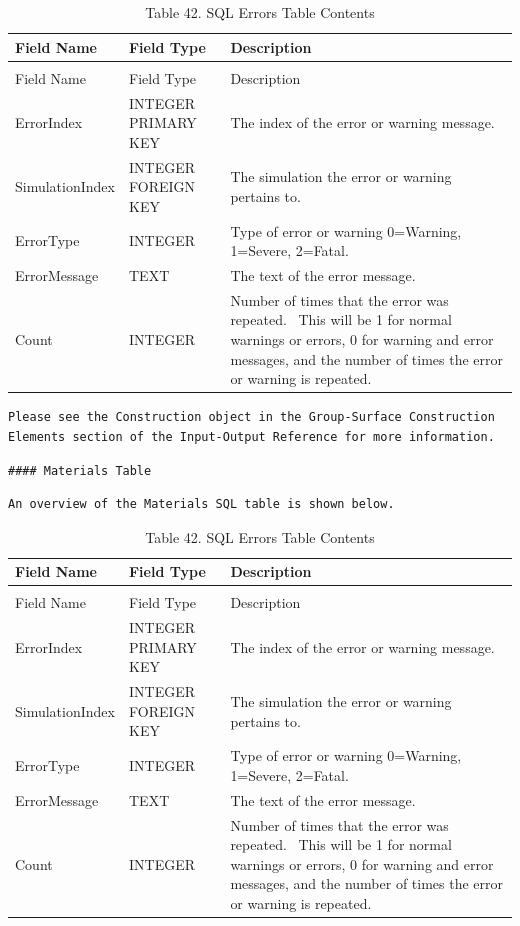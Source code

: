 \begin{longtable}[c]{p{1.5in}p{1.5in}p{2.99in}}
\caption{Table 42. SQL Errors Table Contents \label{table:table-42.-sql-errors-table-contents}} \tabularnewline
\toprule 
Field Name & Field Type & Description \tabularnewline
\midrule
\endfirsthead

\caption[]{Table 42. SQL Errors Table Contents} \tabularnewline
\toprule 
Field Name & Field Type & Description \tabularnewline
\midrule
\endhead

ErrorIndex & INTEGER PRIMARY KEY & The index of the error or warning message. \tabularnewline
SimulationIndex & INTEGER FOREIGN KEY & The simulation the error or warning pertains to. \tabularnewline
ErrorType & INTEGER & Type of error or warning 0=Warning, 1=Severe, 2=Fatal. \tabularnewline
ErrorMessage & TEXT & The text of the error message. \tabularnewline
Count & INTEGER & Number of times that the error was repeated.~ This will be 1 for normal warnings or errors, 0 for warning and error messages, and the number of times the error or warning is repeated. \tabularnewline
\bottomrule
\end{longtable}

\begin{lstlisting}
Please see the Construction object in the Group-Surface Construction Elements section of the Input-Output Reference for more information.
\end{lstlisting}

\begin{lstlisting}
#### Materials Table
\end{lstlisting}

\begin{lstlisting}
An overview of the Materials SQL table is shown below.
\end{lstlisting}

\begin{longtable}[c]{p{1.5in}p{1.5in}p{2.99in}}
\caption{Table 42. SQL Errors Table Contents \label{table:table-42.-sql-errors-table-contents}} \tabularnewline
\toprule 
Field Name & Field Type & Description \tabularnewline
\midrule
\endfirsthead

\caption[]{Table 42. SQL Errors Table Contents} \tabularnewline
\toprule 
Field Name & Field Type & Description \tabularnewline
\midrule
\endhead

ErrorIndex & INTEGER PRIMARY KEY & The index of the error or warning message. \tabularnewline
SimulationIndex & INTEGER FOREIGN KEY & The simulation the error or warning pertains to. \tabularnewline
ErrorType & INTEGER & Type of error or warning 0=Warning, 1=Severe, 2=Fatal. \tabularnewline
ErrorMessage & TEXT & The text of the error message. \tabularnewline
Count & INTEGER & Number of times that the error was repeated.~ This will be 1 for normal warnings or errors, 0 for warning and error messages, and the number of times the error or warning is repeated. \tabularnewline
\bottomrule
\end{longtable}

